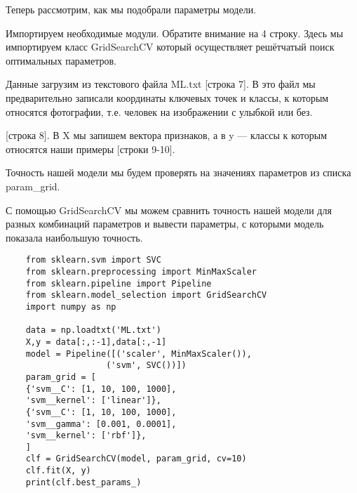 Теперь рассмотрим, как мы подобрали параметры модели.

Импортируем необходимые модули. Обратите внимание на 4 строку. Здесь мы импортируем класс GridSearchCV который осуществляет решётчатый поиск оптимальных параметров. 

Данные загрузим из текстового файла ML.txt [строка 7]. В это файл мы предварительно записали координаты ключевых точек и классы, к которым относятся фотографии, т.е. человек на изображении с улыбкой или без. 

[строка 8]. В X мы запишем вектора признаков, а в y — классы к которым относятся наши примеры [строки 9-10].

Точность нашей модели мы будем проверять на значениях параметров из списка param\_grid.

С помощью GridSearchCV мы можем сравнить точность нашей модели для разных комбинаций параметров и вывести параметры, с которыми модель показала наибольшую точность.

\begin{verbatim}
    from sklearn.svm import SVC
    from sklearn.preprocessing import MinMaxScaler
    from sklearn.pipeline import Pipeline
    from sklearn.model_selection import GridSearchCV
    import numpy as np

    data = np.loadtxt('ML.txt')
    X,y = data[:,:-1],data[:,-1]
    model = Pipeline([('scaler', MinMaxScaler()),
                    ('svm', SVC())])
    param_grid = [
    {'svm__C': [1, 10, 100, 1000],
    'svm__kernel': ['linear']},
    {'svm__C': [1, 10, 100, 1000],
    'svm__gamma': [0.001, 0.0001],
    'svm__kernel': ['rbf']},
    ]
    clf = GridSearchCV(model, param_grid, cv=10)
    clf.fit(X, y)
    print(clf.best_params_)
\end{verbatim}
